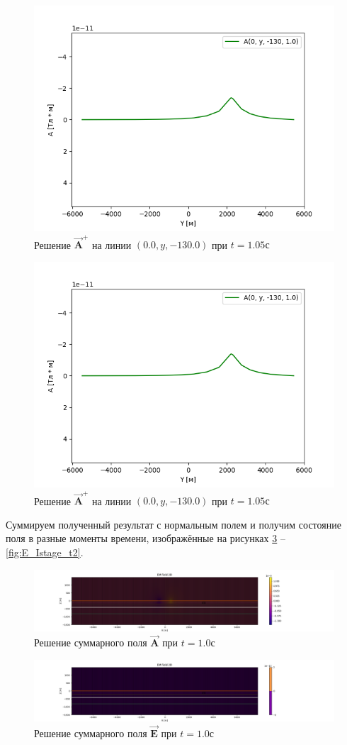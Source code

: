 \begin{figure}
	\centering
	\includegraphics[width=0.5\linewidth]{images/Normal_A(y)_3.png}
	\caption{Решение $\overrightarrow{\textbf{A}}^+$ на линии $(0.0, y, -130.0)$  при $t = 1.05с$}
	\label{fig:A_line_t2}
\end{figure} 

\begin{figure}
	\centering
	\includegraphics[width=0.5\linewidth]{images/Normal_A(y)_3.png}
	\caption{Решение $\overrightarrow{\textbf{A}}^+$ на линии $(0.0, y, -130.0)$  при $t = 1.05с$}
	\label{fig:E_line_t2}
\end{figure} 


Суммируем полученный результат с нормальным полем и получим состояние поля в разные моменты времени, изображённые на рисунках \ref{fig:A_Istage_t0} -- \ref{fig:E_Istage_t2}.

\begin{figure}
	\centering
	\includegraphics[width=1.0\linewidth]{images/Answer_A_Istage_time_layer_1.png}
	\caption{Решение суммарного поля $\overrightarrow{\textbf{A}}$ при $t = 1.0с$}
	\label{fig:A_Istage_t0}
\end{figure} 


\begin{figure}
	\centering
	\includegraphics[width=1.0\linewidth]{images/Answer_E_Istage_time_layer_1.png}
	\caption{Решение суммарного поля $\overrightarrow{\textbf{E}}$ при $t = 1.0с$}
	\label{fig:E_Istage_t0}
\end{figure} 


